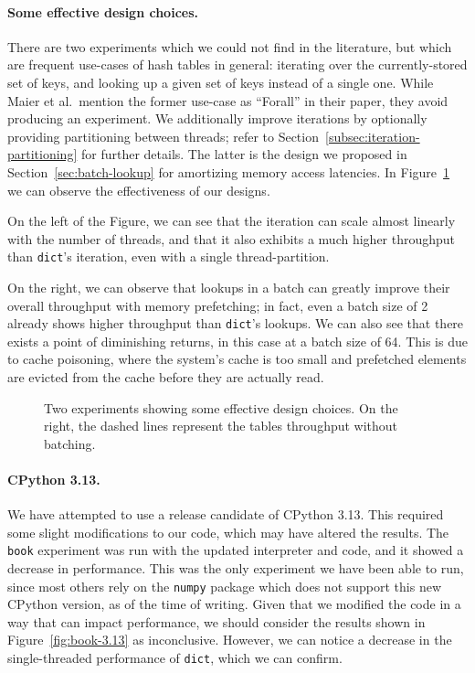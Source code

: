 \paragraph{Some effective design choices.}
There are two experiments which we could not find in the literature, but which are frequent use-cases of hash tables in general: iterating over the currently-stored set of keys, and looking up a given set of keys instead of a single one.
While Maier et al.\ mention the former use-case as ``Forall'' in their paper, they avoid producing an experiment.
We additionally improve iterations by optionally providing partitioning between threads; refer to Section~\ref{subsec:iteration-partitioning} for further details.
The latter is the design we proposed in Section~\ref{sec:batch-lookup} for amortizing memory access latencies.
In Figure~\ref{fig:prepotenza} we can observe the effectiveness of our designs.

On the left of the Figure, we can see that the iteration can scale almost linearly with the number of threads, and that it also exhibits a much higher throughput than \texttt{dict}'s iteration, even with a single thread-partition.

On the right, we can observe that lookups in a batch can greatly improve their overall throughput with memory prefetching; in fact, even a batch size of 2 already shows higher throughput than \texttt{dict}'s lookups.
We can also see that there exists a point of diminishing returns, in this case at a batch size of 64.
This is due to cache poisoning, where the system's cache is too small and prefetched elements are evicted from the cache before they are actually read.

\begin{figure}
    \begin{centering}
        \scalebox{0.4}{}%
        \scalebox{0.4}{}
        \caption{Two experiments showing some effective design choices. On the right, the dashed lines represent the tables throughput without batching.}
        \label{fig:prepotenza}
    \end{centering}
\end{figure}

\paragraph{CPython 3.13.}
We have attempted to use a release candidate of CPython 3.13.
This required some slight modifications to our code, which may have altered the results.
The \texttt{book} experiment was run with the updated interpreter and code, and it showed a decrease in performance.
This was the only experiment we have been able to run, since most others rely on the \texttt{numpy} package which does not support this new CPython version, as of the time of writing.
Given that we modified the code in a way that can impact performance, we should consider the results shown in Figure~\ref{fig:book-3.13} as inconclusive.
However, we can notice a decrease in the single-threaded performance of \texttt{dict}, which we can confirm.

